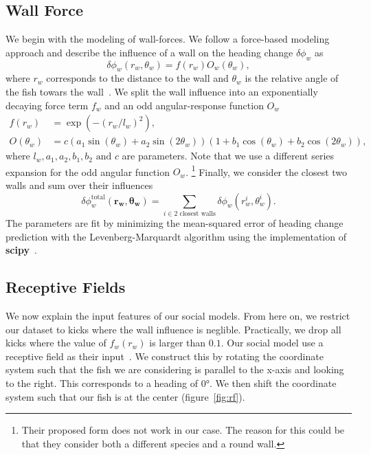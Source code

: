 \documentclass[nobib, a4paper]{tufte-handout}
\begin{document}
\subsection{Wall Force}
We begin with the modeling of wall-forces.
We follow a force-based modeling approach and describe the influence of a wall on the heading change \(\delta \phi_w\) as
\begin{equation*}
  \delta \phi_w (r_w, \theta_w) = f(r_w)O_w(\theta_w),
\end{equation*}
where $r_w$ corresponds to the distance to the wall and $\theta_w$ is the relative angle of the fish towars the wall~\autocite{calovi}.
We split the wall influence into an exponentially decaying force term \(f_w\) and an odd angular-response function \(O_w\)
\begin{align*}
  f(r_w) &= \exp \left( -{(r_w/l_w)}^2 \right), \\
  O(\theta_w) &= c \left(a_1 \sin(\theta_w) + a_2 \sin(2  \theta_w)  \right)  \left(1 +  b_1  \cos(\theta_w) + b_2 \cos(2  \theta_w) \right),
\end{align*}
where $l_w, a_1, a_2, b_1, b_2 \text{ and } c$ are parameters.
Note that we use a different series expansion for the odd angular function \(O_w\).%
\footnote{Their proposed form does not work in our case.
  The reason for this could be that they consider both a different species and a round wall.}
Finally, we consider the closest two walls and sum over their influences
\begin{equation*}
 \delta \phi_w^{\text{total}} \left( \bm{r_w}, \bm{\theta_w} \right) = \sum_{i \in 2 \text{ closest walls}} \delta \phi_w (r_w^i, \theta_w^i).
\end{equation*}
The parameters are fit by minimizing the mean-squared error of heading change prediction with the Levenberg-Marquardt algorithm using the implementation of \textbf{scipy}~\autocite{scipy}.

\subsection{Receptive Fields}
We now explain the input features of our social models.
From here on, we restrict our dataset to kicks where the wall influence is neglible.
Practically, we drop all kicks where the value of \(f_w(r_w)\) is larger than $0.1$.
Our social model use a receptive field as their input~\autocite{discreteModes}.
We construct this by rotating the coordinate system such that the fish we are considering is parallel to the x-axis and looking to the right.
This corresponds to a heading of \ang{0}.
We then shift the coordinate system such that our fish is at the center (figure~\ref{fig:rf}).
\end{document}
